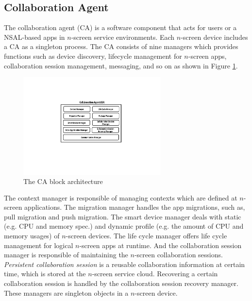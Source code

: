 \documentclass{sig-alternate}
\begin{document}
\subsection{Collaboration Agent}
The collaboration agent (CA) is a software component that acts for users or a NSAL-based apps in $n$-screen service environments.  
Each $n$-screen device includes a CA as a singleton process.
The CA consists of nine managers which provides functions such as device discovery, lifecycle management for $n$-screen apps, collaboration session management, messaging, and so on as shown in Figure \ref{fig:collaborationagent}. 
    \begin{figure}[htb] %
    \centering
    \includegraphics[width=7.5cm,keepaspectratio]{collaborationagent}
    \caption{The CA block architecture}
    \label{fig:collaborationagent}
    \end{figure}

The context manager is responsible of managing contexts which are defined at $n$-screen applications. The migration manager handles the app migrations, such as, pull migration and push migration. 
The smart device manager deals with static (e.g. CPU and memory spec.) and dynamic profile (e.g. the amount of CPU and memory usages) of $n$-screen devices.
The life cycle manager offers life cycle management for logical $n$-screen apps at runtime.
And the collaboration session manager is responsible of maintaining the $n$-screen collaboration sessions.
\textit{Persistent collaboration session} is a reusable collaboration information at certain time, which is stored at the $n$-screen service cloud.
Recovering a certain collaboration session is handled by the collaboration session recovery manager.
These managers are singleton objects in a $n$-screen device.
\end{document}
